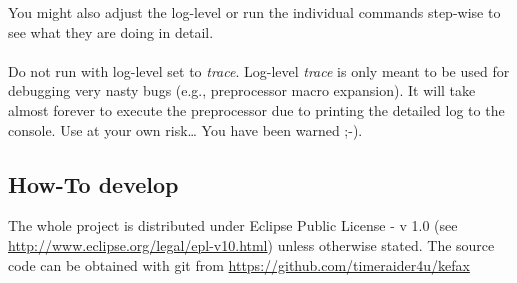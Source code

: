 You might also adjust the log-level or run the individual commands step-wise to see what they are doing in detail.
\\ \ \\
\warning{} Do not run with log-level set to {\it trace}. 
Log-level {\it trace} is only meant to be used for debugging very nasty bugs 
(e.g., preprocessor macro expansion).
It will take almost forever to execute the preprocessor due to printing the detailed log to the console.
Use at your own risk… You have been warned ;-).

\FloatBarrier

\subsection{How-To develop}
The whole project is distributed under Eclipse Public License - v 1.0 
 (see \url{http://www.eclipse.org/legal/epl-v10.html}\cite{EPL_URL}) unless otherwise stated.
The source code can be obtained  with git from \url{https://github.com/timeraider4u/kefax}\cite{Kefax2_URL}
